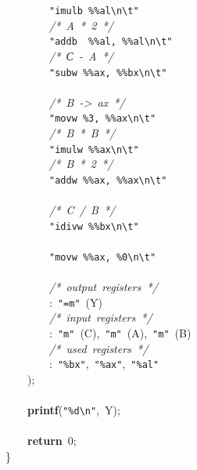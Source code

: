 \documentclass[a4paper,russian,cp1251]{article}
\begin{document}
\mbox{}\ \ \ \ \ \ \ \ \texttt{"{}imulb\ \%\%al}\texttt{\textbackslash{}n\textbackslash{}t}\texttt{"{}} \\
\mbox{}\ \ \ \ \ \ \ \ \textit{/*\ A\ *\ 2\ */} \\
\mbox{}\ \ \ \ \ \ \ \ \texttt{"{}addb\ \ \%\%al,\ \%\%al}\texttt{\textbackslash{}n\textbackslash{}t}\texttt{"{}} \\
\mbox{}\ \ \ \ \ \ \ \ \textit{/*\ С\ -\ A\ */} \\
\mbox{}\ \ \ \ \ \ \ \ \texttt{"{}subw\ \%\%ax,\ \%\%bx}\texttt{\textbackslash{}n\textbackslash{}t}\texttt{"{}} \\
\mbox{} \\
\mbox{}\ \ \ \ \ \ \ \ \textit{/*\ B\ -\textgreater{}\ ax\ */} \\
\mbox{}\ \ \ \ \ \ \ \ \texttt{"{}movw\ \%3,\ \%\%ax}\texttt{\textbackslash{}n\textbackslash{}t}\texttt{"{}} \\
\mbox{}\ \ \ \ \ \ \ \ \textit{/*\ B\ *\ B\ */} \\
\mbox{}\ \ \ \ \ \ \ \ \texttt{"{}imulw\ \%\%ax}\texttt{\textbackslash{}n\textbackslash{}t}\texttt{"{}} \\
\mbox{}\ \ \ \ \ \ \ \ \textit{/*\ B\ *\ 2\ */} \\
\mbox{}\ \ \ \ \ \ \ \ \texttt{"{}addw\ \%\%ax,\ \%\%ax}\texttt{\textbackslash{}n\textbackslash{}t}\texttt{"{}} \\
\mbox{}\ \ \ \ \ \ \ \  \\
\mbox{}\ \ \ \ \ \ \ \ \textit{/*\ C\ /\ B\ */} \\
\mbox{}\ \ \ \ \ \ \ \ \texttt{"{}idivw\ \%\%bx}\texttt{\textbackslash{}n\textbackslash{}t}\texttt{"{}} \\
\mbox{} \\
\mbox{}\ \ \ \ \ \ \ \ \texttt{"{}movw\ \%\%ax,\ \%0}\texttt{\textbackslash{}n\textbackslash{}t}\texttt{"{}} \\
\mbox{} \\
\mbox{}\ \ \ \ \ \ \ \ \textit{/*\ output\ registers\ */} \\
\mbox{}\ \ \ \ \ \ \ \ :\ \texttt{"{}=m"{}}\ (Y) \\
\mbox{}\ \ \ \ \ \ \ \ \textit{/*\ input\ registers\ */} \\
\mbox{}\ \ \ \ \ \ \ \ :\ \texttt{"{}m"{}}\ (C),\ \texttt{"{}m"{}}\ (A),\ \texttt{"{}m"{}}\ (B) \\
\mbox{}\ \ \ \ \ \ \ \ \textit{/*\ used\ registers\ */} \\
\mbox{}\ \ \ \ \ \ \ \ :\ \texttt{"{}\%bx"{}},\ \texttt{"{}\%ax"{}},\ \texttt{"{}\%al"{}} \\
\mbox{}\ \ \ \ ); \\
\mbox{} \\
\mbox{}\ \ \ \ \textbf{printf}(\texttt{"{}\%d}\texttt{\textbackslash{}n}\texttt{"{}},\ Y); \\
\mbox{} \\
\mbox{}\ \ \ \ \textbf{return}\ 0; \\
\mbox{}\} \\
\mbox{} \\
\mbox{}
\end{document}
